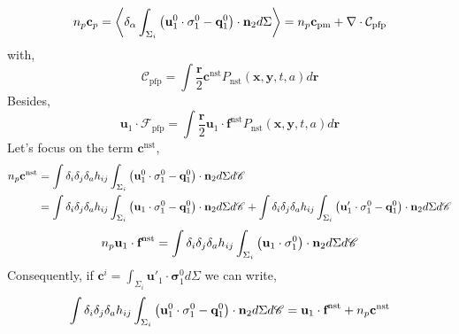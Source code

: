\begin{equation*}  
  n_p \textbf{c}_p= \left<\delta_\alpha 
  \int_{\Sigma_i}
  \left(
    \textbf{u}_1^0 \cdot \mathbf{\sigma}_1^0 
    - \textbf{q}_1^0 
    \right)  
    \cdot \textbf{n}_2d\Sigma\right>
    = n_p \textbf{c}_\text{pm}
    + \mathbf{\nabla}\cdot \mathcal{C}_\text{pfp}
\end{equation*}
with, 
\begin{equation*}
  \mathcal{C}_\text{pfp}
  = \int 
  \frac{\textbf{r}}{2}
  \textbf{c}^\text{nst} 
  P_\text{nst}(\textbf{x},\textbf{y},t,a)
  d\textbf{r}
\end{equation*}
Besides, 
\begin{equation*}
  \textbf{u}_1 \cdot \mathcal{F}_\text{pfp}
  = \int 
  \frac{\textbf{r}}{2}
  \textbf{u}_1 \cdot \textbf{f}^\text{nst} 
  P_\text{nst}(\textbf{x},\textbf{y},t,a)
  d\textbf{r}
\end{equation*}
Let's focus on the term $\textbf{c}^\text{nst}$, 
\begin{align*}  
  n_p \textbf{c}^\text{nst}
  &= \int \delta_i \delta_j \delta_a h_{ij}
  \int_{\Sigma_i}
  \left(
    \textbf{u}_1^0 \cdot \mathbf{\sigma}_1^0 
    - \textbf{q}_1^0 
    \right)  
    \cdot \textbf{n}_2d\Sigma d\mathscr{C}\\
    &= \int \delta_i \delta_j \delta_a h_{ij}
    \int_{\Sigma_i}
    \left(
      \textbf{u}_1 \cdot \mathbf{\sigma}_1^0 
      - \textbf{q}_1^0 
      \right)  
      \cdot \textbf{n}_2d\Sigma d\mathscr{C}
    + \int \delta_i \delta_j \delta_a h_{ij}
    \int_{\Sigma_i}
    \left(
      \textbf{u}_1' \cdot \mathbf{\sigma}_1^0 
      - \textbf{q}_1^0 
      \right)  
      \cdot \textbf{n}_2d\Sigma d\mathscr{C}
\end{align*}
\begin{equation*}  
  n_p \textbf{u}_1  \cdot \textbf{f}^\text{nst}= \int \delta_i \delta_j \delta_a h_{ij}
  \int_{\Sigma_i}
  \left(
    \textbf{u}_1 \cdot \mathbf{\sigma}_1^0 
    \right)  
    \cdot \textbf{n}_2d\Sigma d\mathscr{C}
\end{equation*}
Consequently, if $\textbf{c}^i = \int_{\Sigma_i} \textbf{u}'_1\cdot \bm{\sigma}_1^0 d\Sigma$ we can write, 
\begin{align*}  
  \int \delta_i \delta_j \delta_a h_{ij}
  \int_{\Sigma_i}
  \left(
    \textbf{u}_1^0 \cdot \mathbf{\sigma}_1^0 
    - \textbf{q}_1^0 
    \right)  
    \cdot \textbf{n}_2d\Sigma d\mathscr{C}
  = \textbf{u}_1 \cdot \textbf{f}^\text{nst}
  + n_p \textbf{c}^\text{nst}
\end{align*}